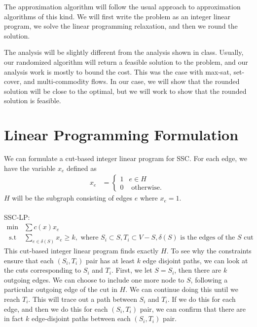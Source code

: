 \documentclass[12pt]{article}
\begin{document}
The approximation algorithm will follow the usual approach to approximation algorithms of this kind. We will first write the problem as an integer linear program, we solve the linear programming relaxation, and then we round the solution. 

The analysis will be slightly different from the analysis shown in class. Usually, our randomized algorithm will return a feasible solution to the problem, and our analysis work is mostly to bound the cost. This was the case with max-sat, set-cover, and multi-commodity flows. In our case, we will show that the rounded solution will be close to the optimal, but we will work to show that the rounded solution is feasible. 

\section{Linear Programming Formulation}

We can formulate a cut-based integer linear program for SSC. For each edge, we have the variable $x_e$ defined as
\begin{align}
 x_e &= \left\{ \begin{array}{cc} 1 & e \in H \\
                                  0 & \text{ otherwise. } \end{array} \right.
\end{align}
$H$ will be the subgraph consisting of edges $e$ where $x_e = 1$. \\ \\
SSC-LP:
\begin{align}
\min & \sum c(x) x_e  \\
\text{ s.t } & \sum_{e \in \delta(S)} x_e \geq k, \text{ where } S_i \subset S, T_i \subset V - S, \delta(S) \text{ is the edges of the $S$ cut }
\end{align}
This cut-based integer linear program finds exactly $H$. To see why the constraints ensure that each $(S_i, T_i)$ pair has at least $k$ edge disjoint paths, we can look at the cuts corresponding to $S_i$ and $T_i$. First, we let $S = S_i$, then there are $k$ outgoing edges. We can choose to include one more node to $S$, following a particular outgoing edge of the cut in $H$. We can continue doing this until we reach $T_i$. This will trace out a path between $S_i$ and $T_i$. If we do this for each edge, and then we do this for each $(S_i, T_i)$ pair, we can confirm that there are in fact $k$ edge-disjoint paths between each $(S_i, T_i)$ pair. 
\end{document}
